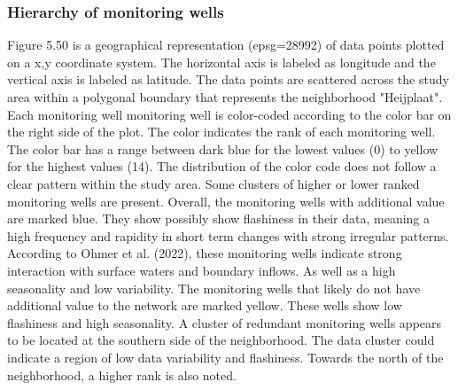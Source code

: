 \subsubsection{Hierarchy of monitoring wells}
Figure 5.50 is a geographical representation (epsg=28992) of data points plotted on a x,y coordinate system. The horizontal axis is labeled as longitude and the vertical axis is labeled as latitude. The data points are scattered across the study area within a polygonal boundary that represents the neighborhood "Heijplaat". Each monitoring well monitoring well is color-coded according to the color bar on the right side of the plot. The color indicates the rank of each monitoring well. The color bar has a range between dark blue for the lowest values (0) to yellow for the highest values (14). The distribution of the color code does not follow a clear pattern within the study area. Some clusters of higher or lower ranked monitoring wells are present. Overall, the monitoring wells with additional value are marked blue. They show possibly show flashiness in their data, meaning a high frequency and rapidity in short term changes with strong irregular patterns. According to Ohmer et al. (2022), these monitoring wells indicate strong interaction with surface waters and boundary inflows. As well as a high seasonality and low variability. The monitoring wells that likely do not have additional value to the network are marked yellow. These wells show low flashiness and high seasonality. A cluster of redundant monitoring wells appears to be located at the southern side of the neighborhood. The data cluster could indicate a region of low data variability and flashiness. Towards the north of the neighborhood, a higher rank is also noted. 

